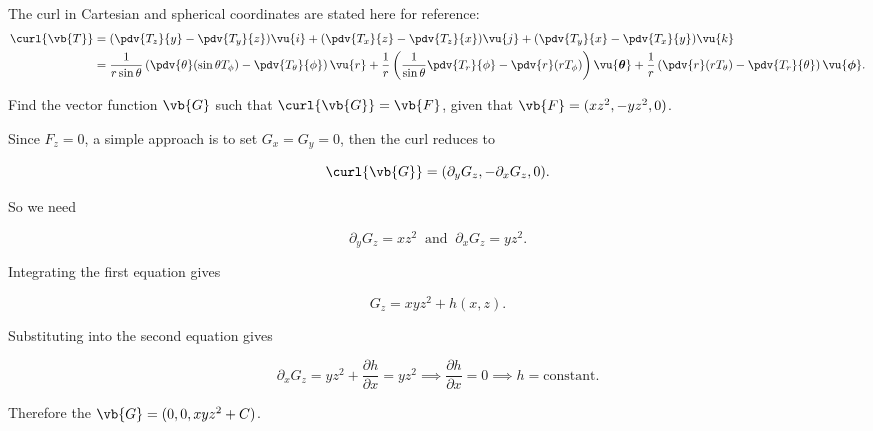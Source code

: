 \documentclass[english,a4paper,12pt]{report}
\begin{document}
The curl in Cartesian and spherical coordinates are stated here for reference:
\begin{equation} 
	\begin{aligned}
	\curl{\vb{T}} &= (\pdv{T_z}{y} - \pdv{T_y}{z})\vu{i} + (\pdv{T_x}{z} - \pdv{T_z}{x})\vu{j} + (\pdv{T_y}{x} - \pdv{T_x}{y})\vu{k} \\ &= \frac{1}{r\sin{\theta}}\left(\pdv{\theta}(\sin{\theta}T_{\phi}) - \pdv{T_{\theta}}{\phi}\right)\vu{r} + \frac{1}{r}\left(\frac{1}{\sin{\theta}}\pdv{T_r}{\phi} - \pdv{r}(rT_{\phi})\right)\vu{\boldsymbol{\theta } } + \frac{1}{r}\left(\pdv{r}(rT_{\theta}) - \pdv{T_r}{\theta}\right)\vu{\boldsymbol{\phi } }. 
    \end{aligned}
\end{equation}
	

{Find the vector function \(\vb{G} \) such that \(\curl{\vb{G} } = \vb{F} \), given that \(\vb{F} = (xz^2,-yz^2,0)\).  }
{Since \(F_{z}= 0 \), a simple approach is to set \(G_{x} = G_{y} =0  \), then the curl reduces to 

\begin{equation}
	\curl{\vb{G} } = (\partial _{y}G_{z} ,- \partial _{x}G_{z}, 0    ). 
\end{equation}

So we need 

\begin{equation}
	\partial _{y}G_{z} = xz^2 ~\text { and }~ \partial _{x}G_{z} = yz^2.    
\end{equation}

Integrating the first equation gives

\begin{equation}
	G_{z} = xyz^2 + h(x,z).  
\end{equation}

Substituting into the second equation gives 

\begin{equation}
	\partial _{x}G_{z} = yz^2 + \frac{\partial h}{\partial x} = yz^2 \implies \frac{\partial h}{\partial x} = 0 \implies h = \text{constant}.   
\end{equation}

Therefore the \(\vb{G} = (0,0,xyz^2 + C)\). 
} 
\end{document}
